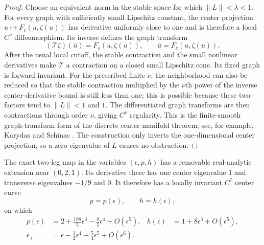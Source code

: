 \documentclass[smallextended,envcountsame]{svjour3}
\newcommand{\norm}[1]{\lVert #1\rVert}
\begin{document}
\begin{proof}
Choose an equivalent norm in the stable space for which
$\norm{L}<\lambda<1$.  For every graph with sufficiently small Lipschitz
constant, the center projection
$u\mapsto F_c(u,\zeta(u))$ has derivative uniformly close to one and is
therefore a local $C^\nu$ diffeomorphism.  Its inverse defines the graph
transform
\[
(\mathcal T\zeta)(\bar u)
=F_s(u,\zeta(u)),
\qquad \bar u=F_c(u,\zeta(u)).
\]
After the usual local cutoff, the stable contraction and the small nonlinear
derivatives make $\mathcal T$ a contraction on a closed small Lipschitz cone.
Its fixed graph is forward invariant.  For the prescribed finite $\nu$, the
neighborhood can also be reduced so that the stable contraction multiplied
by the $\nu$th power of the inverse center-derivative bound is still less than
one; this is possible because these two factors tend to $\norm L<1$ and $1$.
The differentiated graph transforms are then contractions through order
$\nu$, giving $C^\nu$ regularity.  This is the finite-smooth graph-transform form of
the discrete center-manifold theorem; see, for example,
Karydas and Schinas \cite{KarydasSchinas1992}.  The construction only inverts
the one-dimensional center projection, so a zero eigenvalue of $L$ causes no
obstruction.
\end{proof}

\begin{lemma}
\label{lem:slow-curve}
The exact two-leg map in the variables $(\epsilon,p,h)$ has a removable
real-analytic extension near $(0,2,1)$.  Its derivative there has one center
eigenvalue $1$ and transverse eigenvalues $-1/9$ and $0$.  It therefore has a
locally invariant $C^7$ center curve
\[
p=p(\epsilon),\qquad h=h(\epsilon),
\]
on which
\begin{align}
p(\epsilon)&=2+\frac{198}{5}\epsilon^3
-\frac95\epsilon^4+O(\epsilon^5),
&h(\epsilon)&=1+8\epsilon^3+O(\epsilon^5),
\label{eq:center-curve}\\
\epsilon_+&=\epsilon-\frac32\epsilon^4
+\frac54\epsilon^5+O(\epsilon^6).
\label{eq:epsilon-map}
\end{align}
\end{lemma}
\end{document}
